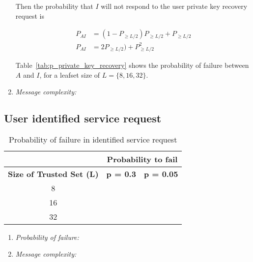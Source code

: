 \begin{enumerate}
    Then the probability that $I$ will not respond to the user private key recovery
request is

    \begin{align}
      P_{AI} &= (1- P_{\ge L/2}) P_{\ge L/2} +  P_{\ge L/2} \\
      P_{AI} &= 2P_{\ge L/2}) + P^2_{\ge L/2}
    \end{align}


    Table~\eqref{tab:p_private_key_recovery} shows the probability of failure
between $A$ and $I$, for a leafset size of $L = \{8,16,32\}$.

    
    \item{\textit{Message complexity:}}
  \end{enumerate}


  \subsection{User identified service request}
  \label{sec:eval_identified_service_request}
  \begin{table}
    \centering
    \footnotesize
    \begin{tabular}{|c|c|c|}
      \cline{2-3}
      \multicolumn{1}{c|}{}&  \multicolumn{2}{c|}{\textbf{Probability to fail}} \\ \cline{2-3}
      \hline
      \textbf{Size of Trusted Set (L)} & \textbf{p = 0.3} & \textbf{p = 0.05} \\
      \hline \hline
      8 &  &  \\
      \hline
      16 &  &  \\
      \hline
      32 &  &  \\
      \hline
    \end{tabular}
    \caption{Probability of failure in identified service request}
    \label{tab:p_identified_service_request}
  \end{table}
  
  \begin{enumerate}
    \item{\textit{Probability of failure:}}
    \item{\textit{Message complexity:}}
  \end{enumerate}

